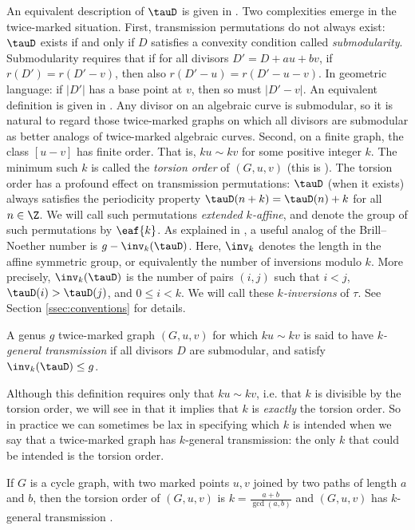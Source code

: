An equivalent description of $\tauD$ is given in .
Two complexities emerge in the twice-marked situation. First, transmission permutations do not always exist: $\tauD$ exists if and only if $D$ satisfies a convexity condition called \emph{submodularity}. 
Submodularity requires that if for all divisors $D' = D+au+bv$, if $r(D') = r(D'-v)$, then also $r(D'-u) = r(D'-u-v)$. 
In geometric language: if $|D'|$ has a base point at $v$, then so must $|D'-v|$. An equivalent definition is given in .
Any divisor on an algebraic curve is submodular, so it is natural to regard those twice-marked graphs on which all divisors are submodular as better analogs of twice-marked algebraic curves. 
Second, on a finite graph, the class $[u-v]$ has finite order. That is, $ku \sim kv$ for some positive integer $k$. The minimum such $k$ is called the \emph{torsion order} of $(G,u,v)$ (this is ). The torsion order has a profound effect on transmission permutations: $\tauD$ (when it exists) always satisfies the periodicity property $\tauD(n+k) = \tauD(n)+k$ for all $n \in \Z$. We will call such permutations \emph{extended $k$-affine}, and denote the group of such permutations by $\eaf{k}$. As explained in \cite{Pfl22}, a useful analog of the Brill--Noether number is $g - \inv_k(\tauD)$. Here, $\inv_k$ denotes the length in the affine symmetric group, or equivalently the number of inversions modulo $k$. More precisely, $\inv_k(\tauD)$ is the number of pairs $(i,j)$ such that $i<j$, $\tauD(i) > \tauD(j)$, and $0 \leq i < k$. We will call these \emph{$k$-inversions} of $\tau$. See Section \ref{ssec:conventions} for details.

\begin{defi}
A genus $g$ twice-marked graph $(G,u,v)$ for which $ku \sim kv$ is said to have \emph{$k$-general transmission} if all divisors $D$ are submodular, and satisfy $\inv_k(\tauD) \leq g$.
\end{defi}

Although this definition requires only that $k u \sim kv$, i.e. that $k$ is divisible by the torsion order, we will see in  that it implies that $k$ is \emph{exactly} the torsion order. So in practice we can sometimes be lax in specifying which $k$ is intended when we say that a twice-marked graph has $k$-general transmission: the only $k$ that could be intended is the torsion order.

\begin{example}\label{eg:cycle}
    If $G$ is a cycle graph, with two marked points $u,v$ joined by two paths of length $a$ and $b$, then the torsion order of $(G,u,v)$ is $k =\frac{a+b}{\gcd(a,b)}$ and $(G,u,v)$ has $k$-general transmission \cite[\S 2.1]{Pfl22}.
\end{example}

